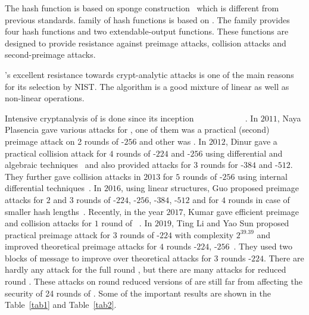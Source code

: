 The \KECCAK{} hash function is based on sponge construction~\cite{bertoni2011cryptographic} which is different from previous \SHA{} standards.  family of hash functions is based on \Keccak{}. The  family provides four hash functions and two extendable-output functions. These functions are designed to provide resistance against preimage attacks, collision attacks and second-preimage attacks.

\Keccak{}'s excellent resistance towards crypt-analytic attacks is one of the main reasons for its selection by NIST. The algorithm is a good mixture of linear as well as non-linear operations.

Intensive cryptanalysis of \KECCAK{} is done since its inception ~\cite{bernstein2010second}~\cite{naya2011practical}~\cite{dinur2012new}~\cite{dinur2013collision}~\cite{morawiecki2013sat}
~\cite{dinur2014improved}~\cite{chang20141st}~\cite{guo2016linear}~\cite{qiao2017new}~\cite{song2017non}~\cite{kumar2018cryptanalysis}. In $2011$, Naya Plasencia \etal gave various attacks for \KECCAK{}, one of them was a practical (second) preimage attack on 2 rounds of \KECCAK-$256$ and other was . In $2012$, Dinur \etal gave a practical collision attack for $4$ rounds of \KECCAK-$224$ and \KECCAK-$256$ using differential and algebraic techniques~\cite{dinur2012new} and also provided attacks for $3$ rounds for \KECCAK-$384$ and \KECCAK-$512$. They further gave collision attacks in $2013$ for $5$ rounds of \KECCAK-$256$ using internal differential techniques~\cite{dinur2013collision}. In $2016$, using linear structures, Guo \etal proposed preimage attacks for $2$ and $3$ rounds of \KECCAK-$224$, \KECCAK-$256$, \KECCAK-$384$, \KECCAK-$512$ and for $4$ rounds in case of smaller hash lengths~\cite{guo2016linear}. Recently, in the year $2017$, Kumar \etal gave efficient preimage and collision attacks for $1$ round of \KECCAK~\cite{kumar2018cryptanalysis}. In $2019$, Ting Li and Yao Sun proposed practical preimage attack for $3$ rounds of \KECCAK-$224$ with complexity $2^{39.39}$ and improved theoretical preimage attacks for $4$ rounds \KECCAK-$224$, \KECCAK-$256$~\cite{lipreimage}. They used two blocks of message to improve over theoretical attacks for $3$ rounds \KECCAK-$224$. There are hardly any attack for the full round \KECCAK{}, but there are many attacks for reduced round \Keccak{}. These attacks on round reduced versions of \KECCAK{} are still far from affecting the security of 24 rounds of \KECCAK{}. Some of the important results are shown in the Table~\ref{tab1} and Table~\ref{tab2}.

